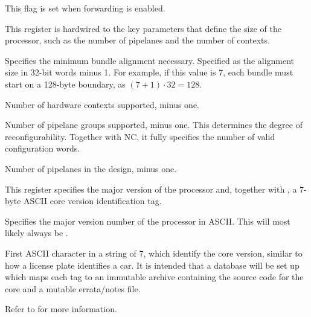 \reset{*}
This flag is set when forwarding is enabled.


This register is hardwired to the key parameters that define the size of the
processor, such as the number of pipelanes and the number of contexts.

\reset{****}
Specifies the minimum bundle alignment necessary. Specified as the alignment
size in 32-bit words minus 1. For example, if this value is 7, each bundle must
start on a 128-byte boundary, as $(7 + 1) \cdot 32 = 128$.

\reset{****}
Number of hardware contexts supported, minus one.

\reset{****}
Number of pipelane groups supported, minus one. This determines the degree of
reconfigurability. Together with NC, it fully specifies the number of valid
configuration words.

\reset{****}
Number of pipelanes in the design, minus one.


This register specifies the major version of the processor and, together with
, a 7-byte ASCII core version identification tag.

Specifies the major version number of the \rvex{} processor in ASCII. This will
most likely always be .

First ASCII character in a string of 7, which identify the core version,
similar to how a license plate identifies a car. It is intended that a database
will be set up which maps each tag to an immutable archive containing the source
code for the core and a mutable errata/notes file.



Refer to  for more information.

